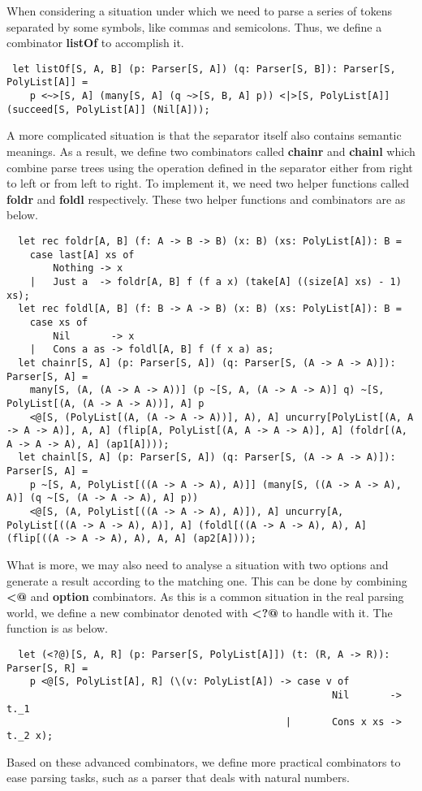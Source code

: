 When considering a situation under which we need to parse a series of tokens separated by some symbols, like commas and semicolons. Thus, we define a combinator \textbf{listOf} to accomplish it.
\begin{lstlisting}
 let listOf[S, A, B] (p: Parser[S, A]) (q: Parser[S, B]): Parser[S, PolyList[A]] =
	p <~>[S, A] (many[S, A] (q ~>[S, B, A] p)) <|>[S, PolyList[A]] (succeed[S, PolyList[A]] (Nil[A]));
\end{lstlisting}
A more complicated situation is that the separator itself also contains semantic meanings. As a result, we define two combinators called \textbf{chainr} and \textbf{chainl} which combine parse trees using the operation defined in the separator either from right to left or from left to right. To implement it, we need two helper functions called \textbf{foldr} and \textbf{foldl} respectively. These two helper functions and combinators are as below.
\begin{lstlisting}
  let rec foldr[A, B] (f: A -> B -> B) (x: B) (xs: PolyList[A]): B =
	case last[A] xs of
		Nothing -> x
	|	Just a  -> foldr[A, B] f (f a x) (take[A] ((size[A] xs) - 1) xs);
  let rec foldl[A, B] (f: B -> A -> B) (x: B) (xs: PolyList[A]): B =
	case xs of
		Nil 	  -> x
	|	Cons a as -> foldl[A, B] f (f x a) as;
  let chainr[S, A] (p: Parser[S, A]) (q: Parser[S, (A -> A -> A)]): Parser[S, A] =
	many[S, (A, (A -> A -> A))] (p ~[S, A, (A -> A -> A)] q) ~[S, PolyList[(A, (A -> A -> A))], A] p
	<@[S, (PolyList[(A, (A -> A -> A))], A), A] uncurry[PolyList[(A, A -> A -> A)], A, A] (flip[A, PolyList[(A, A -> A -> A)], A] (foldr[(A, A -> A -> A), A] (ap1[A])));
  let chainl[S, A] (p: Parser[S, A]) (q: Parser[S, (A -> A -> A)]): Parser[S, A] =
	p ~[S, A, PolyList[((A -> A -> A), A)]] (many[S, ((A -> A -> A), A)] (q ~[S, (A -> A -> A), A] p))
	<@[S, (A, PolyList[((A -> A -> A), A)]), A] uncurry[A, PolyList[((A -> A -> A), A)], A] (foldl[((A -> A -> A), A), A] (flip[((A -> A -> A), A), A, A] (ap2[A])));
\end{lstlisting}
What is more, we may also need to analyse a situation with two options and generate a result according to the matching one. This can be done by combining \textbf{<@} and \textbf{option} combinators. As this is a common situation in the real parsing world, we define a new combinator denoted with \textbf{<?@} to handle with it. The function is as below.
\begin{lstlisting}
  let (<?@)[S, A, R] (p: Parser[S, PolyList[A]]) (t: (R, A -> R)): Parser[S, R] =
	p <@[S, PolyList[A], R] (\(v: PolyList[A]) -> case v of
														Nil 	  -> t._1
												|		Cons x xs -> t._2 x);
\end{lstlisting}
Based on these advanced combinators, we define more practical combinators to ease parsing tasks, such as a parser that deals with natural numbers.

